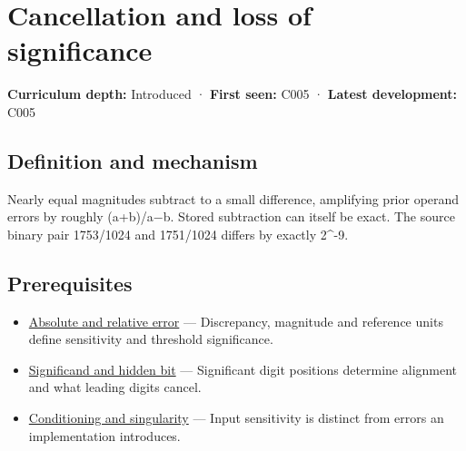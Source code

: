 \hypertarget{appendix-a2773a6a2f9d}{}\label{referencestart:appendix-a2773a6a2f9d}
\section{Cancellation and loss of significance}\label{appendix-a2773a6a2f9d-cancellation-and-loss-of-significance}

\hypertarget{appendix-a2773a6a2f9d-cancellation-and-loss-of-significance}{}

\textbf{Curriculum depth:} Introduced · \textbf{First seen:} C005 · \textbf{Latest development:} C005

\begin{allmightroledefinition}

\subsection{Definition and mechanism}\label{appendix-a2773a6a2f9d-definition-and-mechanism}

\hypertarget{appendix-a2773a6a2f9d-definition-and-mechanism}{}

Nearly equal magnitudes subtract to a small difference, amplifying prior operand errors by roughly (\textbar a\textbar+\textbar b\textbar)/\textbar a−b\textbar. Stored subtraction can itself be exact. The source binary pair 1753/1024 and 1751/1024 differs by exactly 2\^{}-9.

\end{allmightroledefinition}

\subsection{Prerequisites}\label{appendix-a2773a6a2f9d-prerequisites}

\hypertarget{appendix-a2773a6a2f9d-prerequisites}{}

\begin{itemize}
\tightlist
\item
  \hyperref[appendix-3ae74e89b4e6]{Absolute and relative error} --- Discrepancy, magnitude and reference units define sensitivity and threshold significance.
\item
  \hyperref[appendix-a24fd710cf67]{Significand and hidden bit} --- Significant digit positions determine alignment and what leading digits cancel.
\item
  \hyperref[appendix-8f6a01f284a7]{Conditioning and singularity} --- Input sensitivity is distinct from errors an implementation introduces.
\end{itemize}

